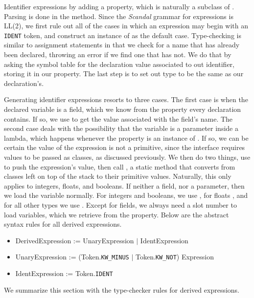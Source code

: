 Identifier expressions by adding a  property, which is naturally a subclass of . Parsing is done in the  method. Since the \emph{Scandal} grammar for expressions is LL(2), we first rule out all of the cases in which an expression may begin with an \texttt{IDENT} token, and construct an instance of  as the default case. Type-checking is similar to assignment statements in that we check for a name that has already been declared, throwing an error if we find one that has not. We do that by asking the symbol table for the declaration value associated to out identifier, storing it in our  property. The last step is to set out type to be the same as our declaration's.

Generating identifier expressions resorts to three cases. The first case is when the declared variable is a field, which we know from the  property every declaration contains. If so, we use  to get the value associated with the field's name. The second case deals with the possibility that the variable is a parameter inside a lambda, which happens whenever the  property is an instance of . If so, we can be certain the value of the expression is not a primitive, since the  interface requires values to be passed as classes, as discussed previously. We then do two things, use  to push the expression's value, then call , a static method that converts from classes left on top of the stack to their primitive values. Naturally, this only applies to integers, floats, and booleans. If neither a field, nor a parameter, then we load the variable normally. For integers and booleans, we use , for floats , and for all other types we use . Except for fields, we always need a slot number to load variables, which we retrieve from the  property. Below are the abstract syntax rules for all derived expressions.

\begin{itemize}
	\item DerivedExpression := UnaryExpression $|$ IdentExpression
	\item UnaryExpression := (Token.\texttt{KW\_MINUS} $|$ Token.\texttt{KW\_NOT}) Expression
	\item IdentExpression := Token.\texttt{IDENT}
\end{itemize}

We summarize this section with the type-checker rules for derived expressions.

